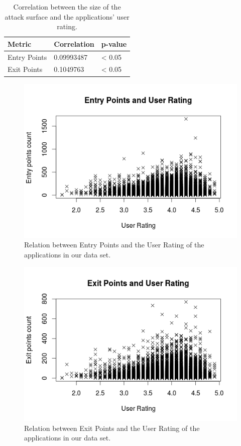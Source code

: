 \documentclass{sig-alternate}
\begin{document}
\begin{table}
  \centering

  \label{tab:result_rq2_2}

  \begin{tabular}{|l|l|l|}
  \hline
  \textbf{Metric} & \textbf{Correlation} & \textbf{p-value}\\ 
  \hline
  Entry Points & 0.09993487 & < 0.05 \\
  Exit Points & 0.1049763 & < 0.05 \\
  \hline
  \end{tabular}

  \caption{Correlation between the size of the attack surface and the applications' user rating.}
\end{table}

\begin{figure}
  \centering
  \includegraphics[scale=0.50]{figs/entry_point_user_rating.png}
  \caption{Relation between Entry Points and the User Rating of the applications in our data set.}
  \label{fig:entry_points_user_rating}
\end{figure}

\begin{figure}
  \centering
  \includegraphics[scale=0.50]{figs/exit_point_user_rating.png}
  \caption{Relation between Exit Points and the User Rating of the applications in our data set.}  
  \label{fig:exit_points_user_rating}
\end{figure}
\end{document}
